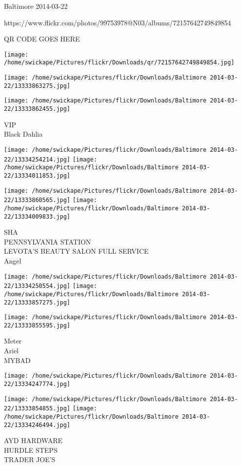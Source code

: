 \documentclass[10pt,letterpaper]{article}
\begin{document}
Baltimore 2014-03-22

https://www.flickr.com/photos/99753978@N03/albums/72157642749849854

QR CODE GOES HERE

\texttt{[image: /home/swickape/Pictures/flickr/Downloads/qr/72157642749849854.jpg]}
\pagebreak

\texttt{[image: /home/swickape/Pictures/flickr/Downloads/Baltimore 2014-03-22/13333863275.jpg]}

\vspace{0.25in}
\texttt{[image: /home/swickape/Pictures/flickr/Downloads/Baltimore 2014-03-22/13333862455.jpg]}

VIP\\
Black Dahlia\\
\pagebreak

\texttt{[image: /home/swickape/Pictures/flickr/Downloads/Baltimore 2014-03-22/13334254214.jpg]}
\texttt{[image: /home/swickape/Pictures/flickr/Downloads/Baltimore 2014-03-22/13334011853.jpg]}

\texttt{[image: /home/swickape/Pictures/flickr/Downloads/Baltimore 2014-03-22/13333860565.jpg]}
\texttt{[image: /home/swickape/Pictures/flickr/Downloads/Baltimore 2014-03-22/13334009833.jpg]}

SHA\\
PENNSYLVANIA STATION\\
LEVOTA'S BEAUTY SALON FULL SERVICE\\
Angel\\
\pagebreak

\texttt{[image: /home/swickape/Pictures/flickr/Downloads/Baltimore 2014-03-22/13334250554.jpg]}
\texttt{[image: /home/swickape/Pictures/flickr/Downloads/Baltimore 2014-03-22/13333857275.jpg]}

\texttt{[image: /home/swickape/Pictures/flickr/Downloads/Baltimore 2014-03-22/13333855595.jpg]}

Meter\\
Ariel\\
MYBAD\\
\pagebreak

\texttt{[image: /home/swickape/Pictures/flickr/Downloads/Baltimore 2014-03-22/13334247774.jpg]}

\vspace{0.25in}
\texttt{[image: /home/swickape/Pictures/flickr/Downloads/Baltimore 2014-03-22/13333854855.jpg]}
\texttt{[image: /home/swickape/Pictures/flickr/Downloads/Baltimore 2014-03-22/13334246494.jpg]}

AYD HARDWARE\\
HURDLE STEPS\\
TRADER JOE'S\\
\pagebreak
\end{document}
